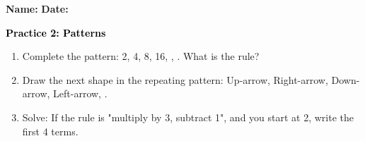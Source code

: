 \documentclass[12pt, letterpaper, fleqn]{article}
\newcommand{\blank}{\underline{\hspace{2.2cm}}}
\begin{document}
\textbf{Name:} \underline{\hspace{5cm}}
\hfill
\textbf{Date:} \underline{\hspace{3cm}}\\

\begin{tcolorbox}[colback=customteal!20]
    \large\textcolor{black}{\textbf{Practice 2: Patterns}}
\end{tcolorbox}
\begin{enumerate}[itemsep=3.5cm, leftmargin=0.6cm]
\item Complete the pattern: 2, 4, 8, 16, \blank, \blank. What is the rule?
\vspace{3cm}
\item Draw the next shape in the repeating pattern: Up-arrow, Right-arrow, Down-arrow, Left-arrow, \blank.
\vspace{3cm}
\item Solve: If the rule is "multiply by 3, subtract 1", and you start at 2, write the first 4 terms.
\end{enumerate}
\end{document}
